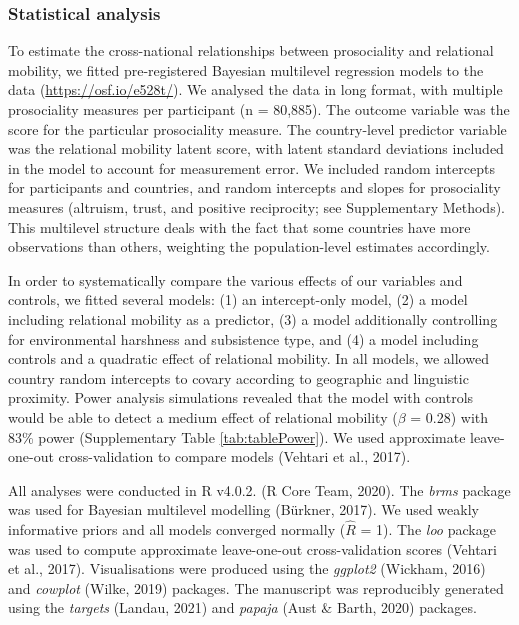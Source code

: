 \documentclass[
  man,floatsintext]{apa6}
\begin{document}
\hypertarget{statistical-analysis}{%
\subsubsection{Statistical analysis}\label{statistical-analysis}}

To estimate the cross-national relationships between prosociality and relational mobility, we fitted pre-registered Bayesian multilevel regression models to the data (\url{https://osf.io/e528t/}). We analysed the data in long format, with multiple prosociality measures per participant (n = 80,885). The outcome variable was the score for the particular prosociality measure. The country-level predictor variable was the relational mobility latent score, with latent standard deviations included in the model to account for measurement error. We included random intercepts for participants and countries, and random intercepts and slopes for prosociality measures (altruism, trust, and positive reciprocity; see Supplementary Methods). This multilevel structure deals with the fact that some countries have more observations than others, weighting the population-level estimates accordingly.

In order to systematically compare the various effects of our variables and controls, we fitted several models: (1) an intercept-only model, (2) a model including relational mobility as a predictor, (3) a model additionally controlling for environmental harshness and subsistence type, and (4) a model including controls and a quadratic effect of relational mobility. In all models, we allowed country random intercepts to covary according to geographic and linguistic proximity. Power analysis simulations revealed that the model with controls would be able to detect a medium effect of relational mobility (\(\beta\) = 0.28) with 83\% power (Supplementary Table \ref{tab:tablePower}). We used approximate leave-one-out cross-validation to compare models (Vehtari et al., 2017).

All analyses were conducted in R v4.0.2. (R Core Team, 2020). The \emph{brms} package was used for Bayesian multilevel modelling (Bürkner, 2017). We used weakly informative priors and all models converged normally (\(\hat{R}\) = 1). The \emph{loo} package was used to compute approximate leave-one-out cross-validation scores (Vehtari et al., 2017). Visualisations were produced using the \emph{ggplot2} (Wickham, 2016) and \emph{cowplot} (Wilke, 2019) packages. The manuscript was reproducibly generated using the \emph{targets} (Landau, 2021) and \emph{papaja} (Aust \& Barth, 2020) packages.
\end{document}
